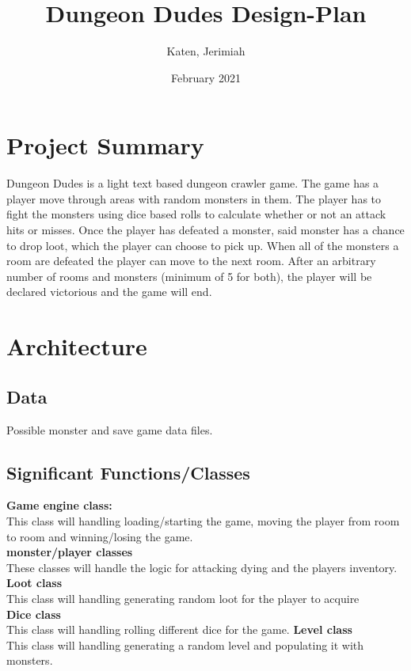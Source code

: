 \documentclass{article}
\title{Dungeon Dudes Design-Plan}
\author{Katen, Jerimiah}
\date{February 2021}
\begin{document}
\maketitle

\section{Project Summary}

Dungeon Dudes is a light text based dungeon crawler game. The game has a player move through areas with random monsters in them. The player has to fight the monsters using dice based rolls to calculate whether or not an attack hits or misses. Once the player has defeated a monster, said monster has a chance to drop loot, which the player can choose to pick up. When all of the monsters a room are defeated the player can move to the next room. After an arbitrary number of rooms and monsters (minimum of 5 for both), the player will be declared victorious and the game will end.

\section{Architecture}

\subsection{Data}

Possible monster and save game data files.

\subsection{Significant Functions/Classes}

\textbf{Game engine class:}
\\[.5cm]
This class will handling loading/starting the game, moving the player from room to room and winning/losing the game. 
\\[.5cm]
\textbf{monster/player classes}
\\[.5cm]
These classes will handle the logic for attacking dying and the players inventory.
\\[.5cm]
\textbf{Loot class}
\\[.5cm]
This class will handling generating random loot for the player to acquire
\\[.5cm]
\textbf{Dice class}
\\[.5cm]
This class will handling rolling different dice for the game.
\textbf{Level class}
\\[.5cm]
This class will handling generating a random level and populating it with monsters.
\end{document}
